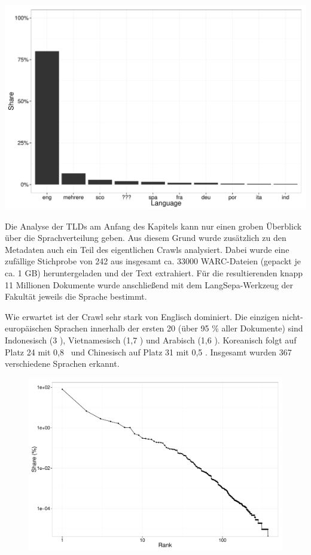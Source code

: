 \documentclass[a4paper,12pt,titlepage=false]{scrreprt}
\begin{document}
\begin{center}
    \includegraphics[width=.9\textwidth]{plots/plot_lang_top10}
\end{center}

\noindent
Die Analyse der TLDs am Anfang des Kapitels kann nur einen groben Überblick über die Sprachverteilung geben. Aus diesem Grund wurde zusätzlich zu den Metadaten auch ein Teil des eigentlichen Crawls analysiert. Dabei wurde eine zufällige Stichprobe von 242 aus insgesamt ca. 33000 WARC-Dateien (gepackt je ca. 1 GB) heruntergeladen und der Text extrahiert. Für die resultierenden knapp 11 Millionen Dokumente wurde anschließend mit dem LangSepa-Werkzeug der Fakultät jeweils die Sprache bestimmt.

Wie erwartet ist der Crawl sehr stark von Englisch dominiert. Die einzigen nicht-europäischen Sprachen innerhalb der ersten 20 (über 95 \% aller Dokumente) sind Indonesisch (3 \textperthousand), Vietnamesisch (1,7 \textperthousand) und Arabisch (1,6 \textperthousand). Koreanisch folgt auf Platz 24 mit 0,8 \textperthousand\ und Chinesisch auf Platz 31 mit 0,5 \textperthousand. Insgesamt wurden 367 verschiedene Sprachen erkannt.

\begin{figure}
    \includegraphics[width=.6\textwidth]{plots/plot_lang_log10.pdf}
\end{figure}
\end{document}
